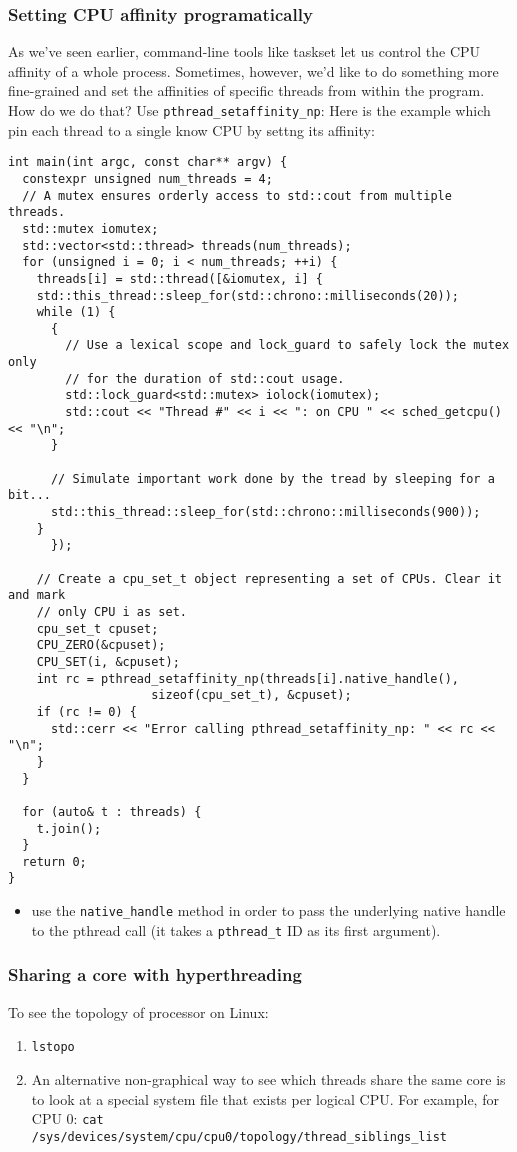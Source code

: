 \documentclass[11pt]{article}
\begin{document}
\subsubsection{Setting CPU affinity programatically}
\label{sec-7-1-5}
As we've seen earlier, command-line tools like taskset let us control the CPU affinity of a whole process. Sometimes, however, we'd like to do something more fine-grained and set the affinities of specific threads from within the program. How do we do that?
Use \texttt{pthread\_setaffinity\_np}:  Here is the example which pin each thread to a single know CPU by settng its affinity:
\begin{verbatim}
int main(int argc, const char** argv) {
  constexpr unsigned num_threads = 4;
  // A mutex ensures orderly access to std::cout from multiple threads.
  std::mutex iomutex;
  std::vector<std::thread> threads(num_threads);
  for (unsigned i = 0; i < num_threads; ++i) {
    threads[i] = std::thread([&iomutex, i] {
	std::this_thread::sleep_for(std::chrono::milliseconds(20));
	while (1) {
	  {
	    // Use a lexical scope and lock_guard to safely lock the mutex only
	    // for the duration of std::cout usage.
	    std::lock_guard<std::mutex> iolock(iomutex);
	    std::cout << "Thread #" << i << ": on CPU " << sched_getcpu() << "\n";
	  }

	  // Simulate important work done by the tread by sleeping for a bit...
	  std::this_thread::sleep_for(std::chrono::milliseconds(900));
	}
      });

    // Create a cpu_set_t object representing a set of CPUs. Clear it and mark
    // only CPU i as set.
    cpu_set_t cpuset;
    CPU_ZERO(&cpuset);
    CPU_SET(i, &cpuset);
    int rc = pthread_setaffinity_np(threads[i].native_handle(),
				    sizeof(cpu_set_t), &cpuset);
    if (rc != 0) {
      std::cerr << "Error calling pthread_setaffinity_np: " << rc << "\n";
    }
  }

  for (auto& t : threads) {
    t.join();
  }
  return 0;
}
\end{verbatim}
\begin{itemize}
\item use the \verb~native_handle~ method in order to pass the underlying native handle to the pthread call (it takes a \verb~pthread_t~ ID as its first argument).
\end{itemize}

\subsubsection{Sharing a core with hyperthreading}
\label{sec-7-1-6}
To see the topology of processor on Linux:
\begin{enumerate}
\item \verb~lstopo~
\item An alternative non-graphical way to see which threads share the same core is to look at a special system file that exists per logical CPU. For example, for CPU 0:
\verb~cat /sys/devices/system/cpu/cpu0/topology/thread_siblings_list~
\end{enumerate}
\end{document}
